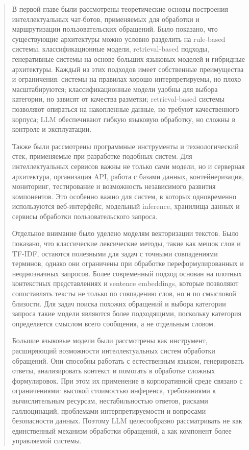 \begin{quote}
В первой главе были рассмотрены теоретические основы построения
интеллектуальных чат-ботов, применяемых для обработки и маршрутизации
пользовательских обращений. Было показано, что существующие архитектуры
можно условно разделить на rule-based системы, классификационные модели,
retrieval-based подходы, генеративные системы на основе больших языковых
моделей и гибридные архитектуры. Каждый из этих подходов имеет
собственные преимущества и ограничения: системы на правилах хорошо
интерпретируемы, но плохо масштабируются; классификационные модели
удобны для выбора категории, но зависят от качества разметки;
retrieval-based системы позволяют опираться на накопленные данные, но
требуют качественного корпуса; LLM обеспечивают гибкую языковую
обработку, но сложны в контроле и эксплуатации.

Также были рассмотрены программные инструменты и технологический стек,
применяемые при разработке подобных систем. Для интеллектуальных
сервисов важны не только сами модели, но и серверная архитектура,
организация API, работа с базами данных, контейнеризация, мониторинг,
тестирование и возможность независимого развития компонентов. Это
особенно важно для систем, в которых одновременно используются
веб-интерфейс, модельный inference, хранилища данных и сервисы обработки
пользовательского запроса.

Отдельное внимание было уделено моделям векторизации текстов. Было
показано, что классические лексические методы, такие как мешок слов и
TF-IDF, остаются полезными для задач с точными совпадениями терминов,
однако они ограничены при обработке переформулированных и неоднозначных
запросов. Более современный подход основан на плотных контекстных
представлениях и sentence embeddings, которые позволяют сопоставлять
тексты не только по совпадению слов, но и по смысловой близости. Для
задач поиска похожих обращений и выбора категории запроса такие модели
являются более подходящими, поскольку категория определяется смыслом
всего сообщения, а не отдельным словом.

Большие языковые модели были рассмотрены как инструмент, расширяющий
возможности интеллектуальных систем обработки обращений. Они способны
работать с естественным языком, генерировать ответы, анализировать
контекст и помогать в обработке сложных формулировок. При этом их
применение в корпоративной среде связано с ограничениями: высокой
стоимостью инференса, требованиями к вычислительным ресурсам,
нестабильностью ответов, рисками галлюцинаций, проблемами
интерпретируемости и вопросами безопасности данных. Поэтому LLM
целесообразно рассматривать не как единственный механизм обработки
обращений, а как компонент более управляемой системы.


\end{quote}
